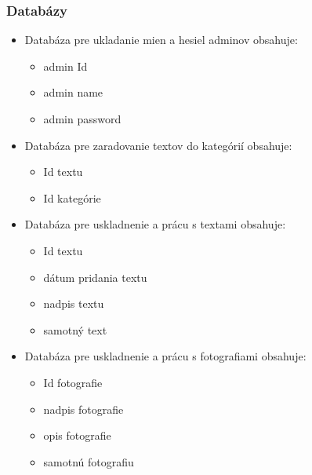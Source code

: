 
\begin{frame}\frametitle{Databázy}
 
  \begin{itemize}

         \item Databáza pre ukladanie mien a hesiel adminov obsahuje:
            \begin{itemize}
            \item admin Id
            \item admin name
            \item admin password
            \end{itemize}
         \item Databáza pre zaradovanie textov do kategórií obsahuje:
          \begin{itemize}
          \item Id textu
          \item Id kategórie
          \end{itemize}
         \item Databáza pre uskladnenie a prácu s textami obsahuje:
          \begin{itemize}
          \item Id textu
          \item dátum pridania textu 
          \item nadpis textu 
          \item samotný text
          \end{itemize}
         \item Databáza pre uskladnenie a prácu s fotografiami obsahuje:
          \begin{itemize}
          \item Id fotografie
          \item nadpis fotografie
          \item opis fotografie 
          \item samotnú fotografiu 
            \end{itemize}

  \end{itemize}
 
 
\end{frame}


